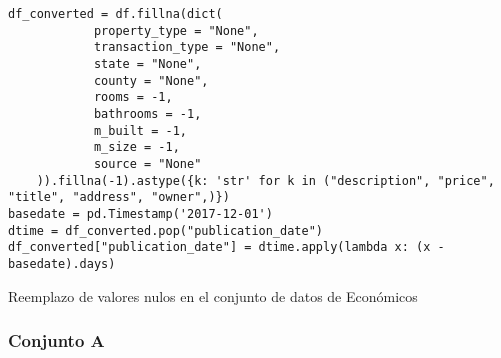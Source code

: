 \begin{listing}[H]
    \begin{verbatim}
df_converted = df.fillna(dict(
            property_type = "None",
            transaction_type = "None",
            state = "None",
            county = "None",
            rooms = -1,
            bathrooms = -1,
            m_built = -1,
            m_size = -1,
            source = "None"
    )).fillna(-1).astype({k: 'str' for k in ("description", "price", "title", "address", "owner",)})
basedate = pd.Timestamp('2017-12-01')
dtime = df_converted.pop("publication_date")
df_converted["publication_date"] = dtime.apply(lambda x: (x - basedate).days)
    \end{verbatim}
\caption{Reemplazo de valores nulos en el conjunto de datos de Económicos}
\label{codigo-replace-nan}
\end{listing}

\subsubsection{Conjunto A}
\label{ds-conjunto-a}

